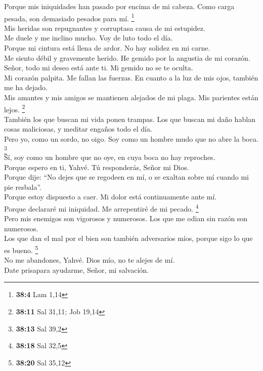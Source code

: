  Porque mis iniquidades han pasado por encima de mi
cabeza. Como carga pesada, son demasiado pesados para mí. \footnote{\textbf{38:4}
  Lam 1,14}\\
 Mis heridas son repugnantes y corruptasa causa de mi
estupidez.\\
 Me duele y me inclino mucho. Voy de luto todo el día.\\
 Porque mi cintura está llena de ardor. No hay solidez en
mi carne.\\
 Me siento débil y gravemente herido. He gemido por la
angustia de mi corazón.\\
 Señor, todo mi deseo está ante ti. Mi gemido no se te
oculta.\\
 Mi corazón palpita. Me fallan las fuerzas. En cuanto a
la luz de mis ojos, también me ha dejado.\\
 Mis amantes y mis amigos se mantienen alejados de mi
plaga. Mis parientes están lejos. \footnote{\textbf{38:11} Sal 31,11;
  Job 19,14}\\
 También los que buscan mi vida ponen trampas. Los que
buscan mi daño hablan cosas maliciosas, y meditar engaños todo el día.\\
 Pero yo, como un sordo, no oigo. Soy como un hombre mudo
que no abre la boca. \footnote{\textbf{38:13} Sal 39,2}\\
 Sí, soy como un hombre que no oye, en cuya boca no hay
reproches.\\
 Porque espero en ti, Yahvé. Tú responderás, Señor mi
Dios.\\
 Porque dije: ``No dejes que se regodeen en mí, o se
exaltan sobre mí cuando mi pie resbala''.\\
 Porque estoy dispuesto a caer. Mi dolor está
continuamente ante mí.\\
 Porque declararé mi iniquidad. Me arrepentiré de mi
pecado. \footnote{\textbf{38:18} Sal 32,5}\\
 Pero mis enemigos son vigorosos y numerosos. Los que me
odian sin razón son numerosos.\\
 Los que dan el mal por el bien son también adversarios
míos, porque sigo lo que es bueno. \footnote{\textbf{38:20} Sal 35,12}\\
 No me abandones, Yahvé. Dios mío, no te alejes de mí.\\
 Date prisapara ayudarme, Señor, mi salvación.

